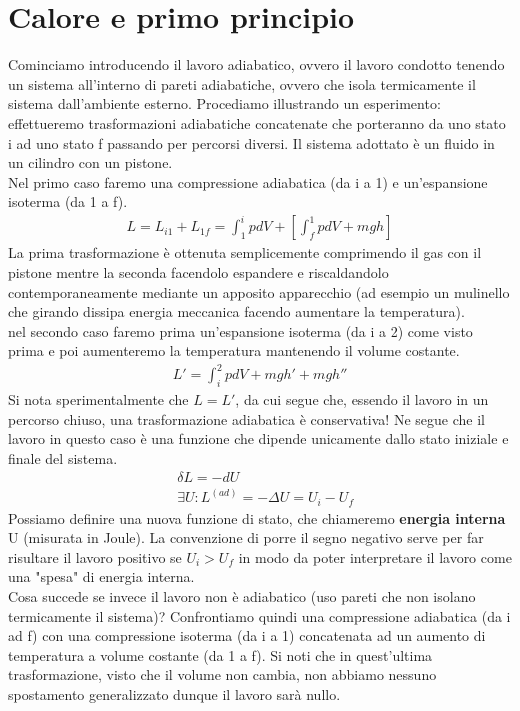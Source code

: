\documentclass[10pt,a4paper]{article}
\begin{document}
\section{Calore e primo principio}
Cominciamo introducendo il lavoro adiabatico, ovvero il lavoro condotto tenendo un sistema all'interno di pareti adiabatiche, ovvero che isola termicamente il sistema dall'ambiente esterno. Procediamo illustrando un esperimento: effettueremo trasformazioni adiabatiche concatenate che porteranno da uno stato i ad uno stato f passando per percorsi diversi. Il sistema adottato è un fluido in un cilindro con un pistone.\\
Nel primo caso faremo una compressione adiabatica (da i a 1) e un'espansione isoterma (da 1 a f). 
\begin{align*}
	L = L_{i1}+L_{1f}= \int_{1}^{i}pdV +[\int_{f}^{1}pdV+mgh]
\end{align*}
La prima trasformazione è ottenuta semplicemente comprimendo il gas con il pistone mentre la seconda facendolo espandere e riscaldandolo contemporaneamente mediante un apposito apparecchio (ad esempio un mulinello che girando dissipa energia meccanica facendo aumentare la temperatura).\\
nel secondo caso faremo prima un'espansione isoterma (da i a 2) come visto prima e poi aumenteremo la temperatura mantenendo il volume costante. 
\begin{align*}
	L' = \int_{i}^{2}pdV+mgh'+mgh''
\end{align*}
Si nota sperimentalmente che $L = L'$, da cui segue che, essendo il lavoro in un percorso chiuso, una trasformazione adiabatica è conservativa! Ne segue che il lavoro in questo caso è una funzione che dipende unicamente dallo stato iniziale e finale del sistema. 
\begin{align*}
	&\delta L = -dU\\
	&\exists U : L^{(ad)} = -\Delta U = U_i-U_f
\end{align*}
Possiamo definire una nuova funzione di stato, che chiameremo \textbf{energia interna} U (misurata in Joule). La convenzione di porre il segno negativo serve per far risultare il lavoro positivo se $U_i>U_f$ in modo da poter interpretare il lavoro come una "spesa" di energia interna.\\
Cosa succede se invece il lavoro non è adiabatico (uso pareti che non isolano termicamente il sistema)? Confrontiamo quindi una compressione adiabatica (da i ad f) con una compressione isoterma (da i a 1) concatenata ad un aumento di temperatura a volume costante (da 1 a f). Si noti che in quest'ultima trasformazione, visto che il volume non cambia, non abbiamo nessuno spostamento generalizzato dunque il lavoro sarà nullo. 
\end{document}
